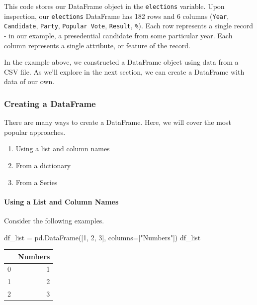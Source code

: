 \documentclass[
  letterpaper,
  DIV=11,
  numbers=noendperiod]{scrreprt}
\let\oldparagraph\paragraph
\renewcommand{\paragraph}[1]{\oldparagraph{#1}\mbox{}}
\newenvironment{Shaded}{\begin{snugshade}}{\end{snugshade}}
\newcommand{\DecValTok}[1]{\textcolor[rgb]{0.68,0.00,0.00}{#1}}
\newcommand{\NormalTok}[1]{\textcolor[rgb]{0.00,0.23,0.31}{#1}}
\newcommand{\OperatorTok}[1]{\textcolor[rgb]{0.37,0.37,0.37}{#1}}
\newcommand{\StringTok}[1]{\textcolor[rgb]{0.13,0.47,0.30}{#1}}
\providecommand{\tightlist}{%
  \setlength{\itemsep}{0pt}\setlength{\parskip}{0pt}}\usepackage{longtable,booktabs,array}
\begin{document}
This code stores our DataFrame object in the \texttt{elections}
variable. Upon inspection, our \texttt{elections} DataFrame has 182 rows
and 6 columns (\texttt{Year}, \texttt{Candidate}, \texttt{Party},
\texttt{Popular\ Vote}, \texttt{Result}, \texttt{\%}). Each row
represents a single record - in our example, a presedential candidate
from some particular year. Each column represents a single attribute, or
feature of the record.

In the example above, we constructed a DataFrame object using data from
a CSV file. As we'll explore in the next section, we can create a
DataFrame with data of our own.

\hypertarget{creating-a-dataframe}{%
\subsubsection{Creating a DataFrame}\label{creating-a-dataframe}}

There are many ways to create a DataFrame. Here, we will cover the most
popular approaches.

\begin{enumerate}
\def\labelenumi{\arabic{enumi}.}
\tightlist
\item
  Using a list and column names
\item
  From a dictionary
\item
  From a Series
\end{enumerate}

\hypertarget{using-a-list-and-column-names}{%
\paragraph{Using a List and Column
Names}\label{using-a-list-and-column-names}}

Consider the following examples.

\begin{Shaded}
\begin{Highlighting}[]
\NormalTok{df\_list }\OperatorTok{=}\NormalTok{ pd.DataFrame([}\DecValTok{1}\NormalTok{, }\DecValTok{2}\NormalTok{, }\DecValTok{3}\NormalTok{], columns}\OperatorTok{=}\NormalTok{[}\StringTok{"Numbers"}\NormalTok{])}
\NormalTok{df\_list}
\end{Highlighting}
\end{Shaded}

\begin{tabular}{lr}
\toprule
{} &  Numbers \\
\midrule
0 &        1 \\
1 &        2 \\
2 &        3 \\
\bottomrule
\end{tabular}
\end{document}
